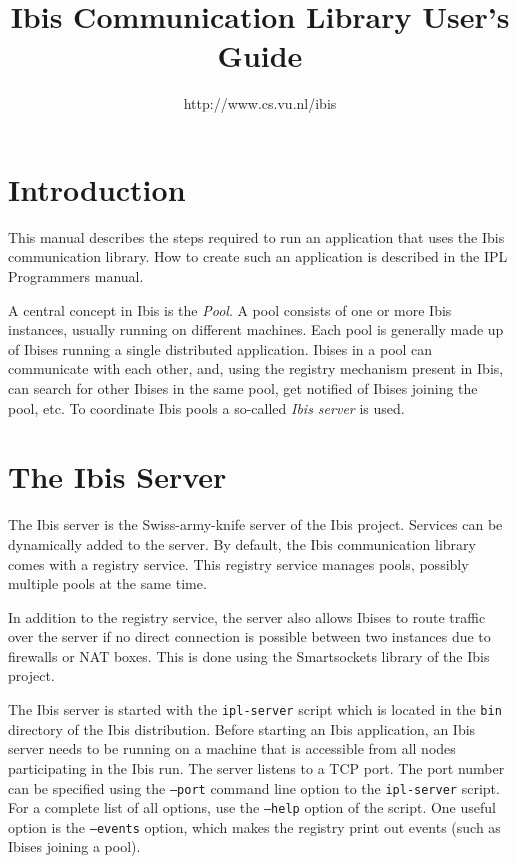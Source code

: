 \documentclass[a4paper,10pt]{article}
\begin{document}
\title{Ibis Communication Library User's Guide}

\author{http://www.cs.vu.nl/ibis}

\maketitle

\section{Introduction}

This manual describes the steps required to run an application that 
uses the Ibis communication library. How to create such an application
is described in the IPL Programmers manual.

A central concept in Ibis is the \emph{Pool}. A pool consists of one or
more Ibis instances, usually running on different machines. Each pool is
generally made up of Ibises running a single distributed application.
Ibises in a pool can communicate with each other, and, using the
registry mechanism present in Ibis, can search for other Ibises in the
same pool, get notified of Ibises joining the pool, etc. To
coordinate Ibis pools a so-called \emph{Ibis server} is used.

\section{The Ibis Server}

The Ibis server is the Swiss-army-knife server of the Ibis project.
Services can be dynamically added to the server. By default, the Ibis
communication library comes with a registry service. This registry
service manages pools, possibly multiple pools at the same time.  

In addition to the registry service, the server also allows
Ibises to route traffic over the server if no direct connection is
possible between two instances due to firewalls or NAT boxes. This is
done using the Smartsockets library of the Ibis project.

The Ibis server is started with the \texttt{ipl-server} script which is
located in the \texttt{bin} directory of the Ibis distribution.  Before
starting an Ibis application, an Ibis server needs to be running on a
machine that is accessible from all nodes participating in the Ibis run.
The server listens to a TCP port. The port number can be specified using
the \texttt{--port} command line option to the \texttt{ipl-server}
script.  For a complete list of all options, use the \texttt{--help}
option of the script. One useful option is the  \texttt{--events}
option, which makes the registry print out events (such as Ibises
joining a pool).
\end{document}
